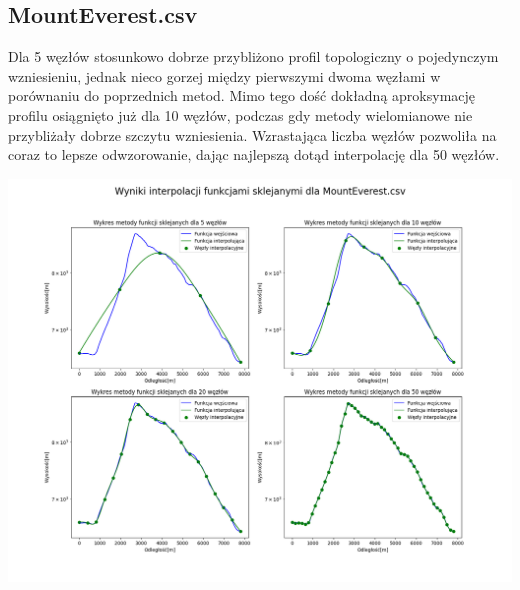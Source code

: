 \documentclass[a4paper,12pt]{article}
\begin{document}
	\subsection{MountEverest.csv}
	Dla 5 węzłów stosunkowo dobrze przybliżono profil topologiczny o pojedynczym wzniesieniu, jednak nieco gorzej między pierwszymi dwoma węzłami w porównaniu do poprzednich metod. Mimo tego dość dokładną aproksymację profilu osiągnięto już dla 10 węzłów, podczas gdy metody wielomianowe nie przybliżały dobrze szczytu wzniesienia. Wzrastająca liczba węzłów pozwoliła na coraz to lepsze odwzorowanie, dając najlepszą dotąd interpolację dla 50 węzłów.
	\begin{center}
        \includegraphics[scale=0.4]{../charts/cubic_spline_MountEverest.png}
    \end{center}
    
    \newpage
\end{document}
